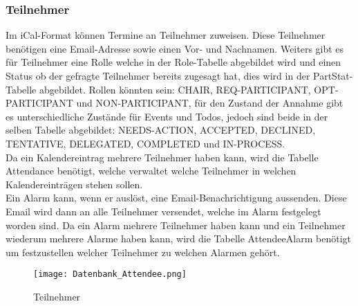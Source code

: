 \subsubsection*{Teilnehmer}
\label{ref:teilnehmer}
Im iCal-Format können Termine an Teilnehmer zuweisen. Diese Teilnehmer benötigen eine Email-Adresse sowie einen Vor- und Nachnamen. Weiters gibt es für Teilnehmer eine Rolle welche in der Role-Tabelle abgebildet wird und einen Status ob der gefragte Teilnehmer bereits zugesagt hat, dies wird in der PartStat-Tabelle abgebildet. Rollen könnten sein: CHAIR, REQ-PARTICIPANT, OPT-PARTICIPANT und NON-PARTICIPANT, für den Zustand der Annahme gibt es unterschiedliche Zustände für Events und Todos, jedoch sind beide in der selben Tabelle abgebildet: NEEDS-ACTION, ACCEPTED, DECLINED, TENTATIVE, DELEGATED, COMPLETED und IN-PROCESS.\\
Da ein Kalendereintrag mehrere Teilnehmer haben kann, wird die Tabelle Attendance benötigt, welche verwaltet welche Teilnehmer in welchen Kalendereinträgen stehen sollen.\\
Ein Alarm kann, wenn er auslöst, eine Email-Benachrichtigung aussenden. Diese Email wird dann an alle Teilnehmer versendet, welche im Alarm festgelegt worden sind. Da ein Alarm mehrere Teilnehmer haben kann und ein Teilnehmer wiederum mehrere Alarme haben kann, wird die Tabelle AttendeeAlarm benötigt um festzustellen welcher Teilnehmer zu welchen Alarmen gehört.
\begin{figure}[H]
	\texttt{[image: Datenbank\_Attendee.png]}
    \caption{Teilnehmer}
    \label{fig:datenbankTeilnehmer}
\end{figure}
\pagebreak